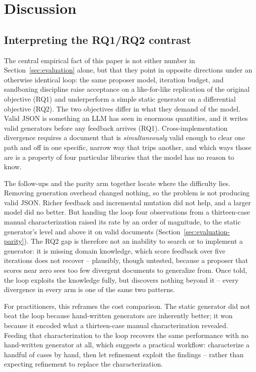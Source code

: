 \section{Discussion}
\label{sec:discussion}

\subsection{Interpreting the RQ1/RQ2 contrast}
The central empirical fact of this paper is not either number in
Section~\ref{sec:evaluation} alone, but that they point in opposite
directions under an otherwise identical loop: the same proposer model,
iteration budget, and sandboxing discipline raise acceptance on a
like-for-like replication of the original objective (RQ1) and underperform
a simple static generator on a differential objective (RQ2). The two
objectives differ in what they demand of the model. Valid JSON is something
an LLM has seen in enormous quantities, and it writes valid generators
before any feedback arrives (RQ1). Cross-implementation divergence requires
a document that is \emph{simultaneously} valid enough to clear one path and
off in one specific, narrow way that trips another, and which ways those
are is a property of four particular libraries that the model has no
reason to know.

The follow-ups and the parity arm together locate where the difficulty
lies. Removing generation overhead changed nothing, so the problem is not
producing valid JSON. Richer feedback and incremental mutation did not help,
and a larger model did no better. But handing the loop four observations
from a thirteen-case manual characterization raised its rate by an order of
magnitude, to the static generator's level and above it on valid documents
(Section~\ref{sec:evaluation-parity}). The RQ2 gap is therefore not an
inability to search or to implement a generator: it is missing domain
knowledge, which score feedback over five iterations does not recover --
plausibly, though untested, because a proposer that scores near zero sees
too few divergent documents to generalize from. Once told, the loop exploits the
knowledge fully, but discovers nothing beyond it -- every divergence in
every arm is one of the same two patterns.

For practitioners, this reframes the cost comparison. The static generator
did not beat the loop because hand-written generators are inherently better;
it won because it encoded what a thirteen-case manual characterization
revealed. Feeding that characterization to the loop recovers the same
performance with no hand-written generator at all, which suggests a
practical workflow: characterize a handful of cases by hand, then let
refinement exploit the findings -- rather than expecting refinement to
replace the characterization.

